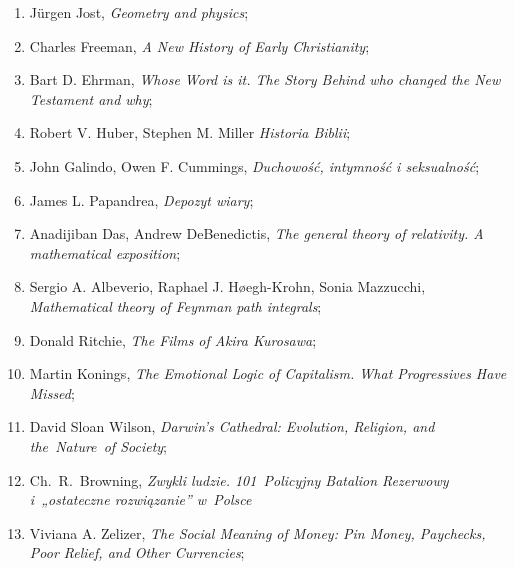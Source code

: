\documentclass[a4paper,11pt]{article}
\begin{document}
\begin{enumerate}
\item J\"{u}rgen Jost, \textit{Geometry and physics};

\item Charles Freeman, \textit{A New History of Early Christianity};

\item Bart D. Ehrman, \textit{Whose Word is it. The Story Behind who
    changed the New Testament and why};

\item Robert V. Huber, Stephen M. Miller \textit{Historia Biblii};

\item John Galindo, Owen F. Cummings, \textit{Duchowość, intymność i
    seksualność};

\item James L. Papandrea, \textit{Depozyt wiary};

\item Anadijiban Das, Andrew DeBenedictis, \textit{The general theory of relativity. A mathematical exposition};

\item Sergio A. Albeverio, Raphael J. H\o egh-Krohn, Sonia Mazzucchi, \textit{Mathematical theory of Feynman path integrals};




\item Donald Ritchie, \textit{The Films of Akira Kurosawa};

\item Martin Konings, \textit{The Emotional Logic of Capitalism. What
    Progressives Have Missed};

\item David Sloan Wilson, \textit{Darwin's Cathedral: Evolution,
    Religion, and the~Nature~of Society};

\item Ch.~R.~Browning, \textit{Zwykli ludzie. 101~Policyjny Batalion
    Rezerwowy i~„ostateczne rozwiązanie” w~Polsce}

\item Viviana A. Zelizer, \textit{The Social Meaning of Money: Pin
    Money, Paychecks, Poor Relief, and Other Currencies};



\end{enumerate}
\end{document}
